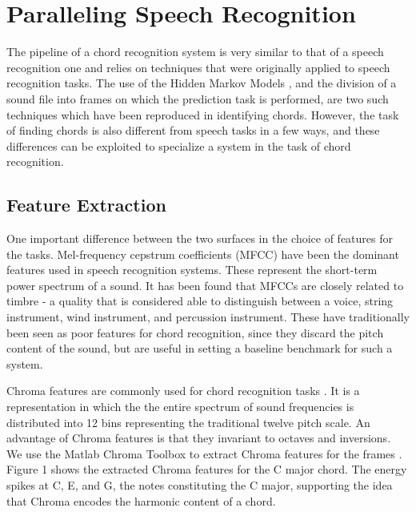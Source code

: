 \documentclass{article}
\begin{document}
\section{Paralleling Speech Recognition}

The pipeline of a chord recognition system is very similar to that of a speech
recognition one and relies on techniques that were originally applied to speech
recognition tasks. The use of the Hidden Markov Models \cite{young} , and the
division of a sound file into frames on which the prediction task is performed,
are two such techniques which have been reproduced in identifying chords.
However, the task of finding chords is also different from speech tasks in a few
ways, and these differences can be exploited to specialize a system in the task
of chord recognition.

\subsection{Feature Extraction}

One important difference between the two surfaces in the choice of features for
the tasks. Mel-frequency cepstrum coefficients (MFCC) have been the dominant
features used in speech recognition systems. These represent the short-term
power spectrum of a sound. It has been found that MFCCs are closely related to
timbre - a quality that is considered able to distinguish between a voice,
string instrument, wind instrument, and percussion instrument. These have
traditionally been seen as poor features for chord recognition, since they
discard the pitch content of the sound, but are useful in setting a baseline
benchmark for such a system.

Chroma features are commonly used for chord recognition tasks \cite{fujishima}.
It is a representation in which the the entire spectrum of sound frequencies is
distributed into 12 bins representing the traditional twelve pitch scale. An
advantage of Chroma features is that they invariant to octaves and inversions.
We use the Matlab Chroma Toolbox to extract Chroma features for the frames
\cite{muller}. Figure 1 shows the extracted Chroma features for the C major
chord. The energy spikes at C, E, and G, the notes constituting the C major,
supporting the idea that Chroma encodes the harmonic content of a chord.
\end{document}
